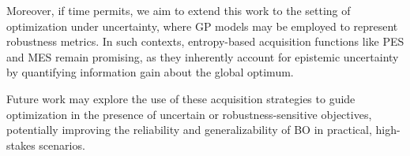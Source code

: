 \documentclass{ut-thesis}
\begin{document}
Moreover, if time permits, we aim to extend this work to the setting of optimization under uncertainty, where GP models may be employed to represent robustness metrics. In such contexts, entropy-based acquisition functions like PES and MES remain promising, as they inherently account for epistemic uncertainty by quantifying information gain about the global optimum. 

Future work may explore the use of these acquisition strategies to guide optimization in the presence of uncertain or robustness-sensitive objectives, potentially improving the reliability and generalizability of BO in practical, high-stakes scenarios.



\end{document}
